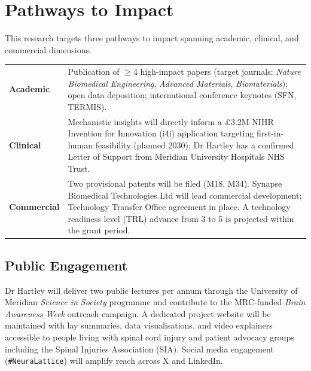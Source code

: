 \documentclass[11pt,a4paper]{article}
\begin{document}
\section{Pathways to Impact}

\begin{tcolorbox}[sectionbox, title=Impact Summary]
This research targets three pathways to impact spanning academic, clinical, and
commercial dimensions.

\vspace{6pt}
\begin{tabular}{@{}p{32mm}p{120mm}@{}}
\textcolor{ukripink}{\textbf{Academic}} &
Publication of \(\geq\)4 high-impact papers (target journals: \textit{Nature
Biomedical Engineering}, \textit{Advanced Materials}, \textit{Biomaterials}); open
data deposition; international conference keynotes (SFN, TERMIS). \\[6pt]
\textcolor{ukripink}{\textbf{Clinical}} &
Mechanistic insights will directly inform a \pounds 3.2M NIHR Invention for Innovation
(i4i) application targeting first-in-human feasibility (planned 2030); Dr Hartley has
a confirmed Letter of Support from Meridian University Hospitals NHS Trust. \\[6pt]
\textcolor{ukripink}{\textbf{Commercial}} &
Two provisional patents will be filed (M18, M34). Synapse Biomedical Technologies Ltd
will lead commercial development; Technology Transfer Office agreement in place. A
technology readiness level (TRL) advance from 3 to 5 is projected within the grant
period. \\
\end{tabular}
\end{tcolorbox}

\subsection{Public Engagement}

Dr Hartley will deliver two public lectures per annum through the University of Meridian
\emph{Science in Society} programme and contribute to the MRC-funded \emph{Brain
Awareness Week} outreach campaign. A dedicated project website will be maintained with
lay summaries, data visualisations, and video explainers accessible to people living
with spinal cord injury and patient advocacy groups including the Spinal Injuries
Association (SIA). Social media engagement (\texttt{\#NeuraLattice}) will amplify reach
across X and LinkedIn.
\end{document}
